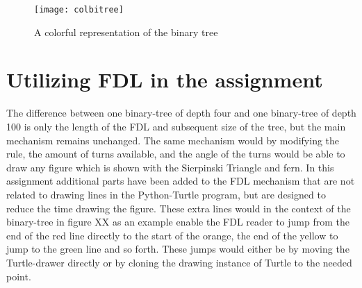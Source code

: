 \documentclass[titlepage]{article}
\begin{document}
\begin{figure}[H]
  \centering
  \texttt{[image: colbitree]}
  \caption{A colorful representation of the binary tree}
  \label{fig:coltree}
\end{figure}

\section{Utilizing FDL in the assignment}
The difference between one binary-tree of depth four and one binary-tree of depth 100 is only the length of the FDL and subsequent size of the tree, but the main mechanism remains unchanged.  The same mechanism would by modifying the rule, the amount of turns available, and the angle of the turns would be able to draw any figure which is shown with the Sierpinski Triangle and fern.  In this assignment additional parts have been added to the FDL mechanism that are not related to drawing lines in the Python-Turtle program, but are designed to reduce the time drawing the figure. These extra lines would in the context of the binary-tree in figure XX  as an example enable the FDL reader to jump from the end of the red line directly to the start of the orange, the end of the yellow to jump to the green line and so forth. These jumps would either be by moving the Turtle-drawer directly or by cloning the drawing instance of Turtle to the needed point. 
\end{document}
